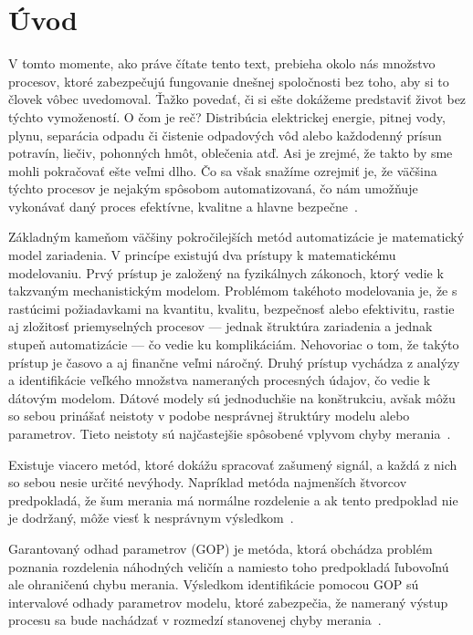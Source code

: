 \chapter*{Úvod}
V tomto momente, ako práve čítate tento text, prebieha okolo nás množstvo procesov, ktoré zabezpečujú fungovanie dnešnej spoločnosti bez toho, aby si to človek vôbec uvedomoval. Ťažko povedať, či si ešte dokážeme predstaviť život bez týchto vymožeností. O čom je reč? Distribúcia elektrickej energie, pitnej vody, plynu, separácia 
odpadu či čistenie odpadových vôd alebo každodenný prísun potravín, liečiv, pohonných hmôt, oblečenia atď. Asi je zrejmé, že takto by sme mohli pokračovať ešte veľmi dlho. Čo sa však snažíme ozrejmiť je, že väčšina týchto procesov je nejakým spôsobom automatizovaná, čo nám umožňuje vykonávať daný proces efektívne, kvalitne a hlavne bezpečne~\cite{spautz:automat_pros:1994}. 

Základným kameňom väčšiny pokročilejších metód automatizácie je matematický model zariadenia. V princípe existujú dva prístupy k matematickému modelovaniu. Prvý prístup je založený na fyzikálnych zákonoch, ktorý vedie k takzvaným mechanistickým modelom. Problémom takéhoto modelovania je, že s rastúcimi požiadavkami na kvantitu, kvalitu, bezpečnosť alebo efektivitu, rastie aj zložitosť priemyselných procesov --- jednak štruktúra zariadenia a jednak stupeň automatizácie --- čo vedie ku komplikáciám. Nehovoriac o tom, že takýto prístup je časovo a aj finančne veľmi náročný. Druhý prístup vychádza z analýzy a identifikácie veľkého množstva nameraných procesných údajov, čo vedie k dátovým modelom. Dátové modely sú jednoduchšie na konštrukciu, avšak môžu so sebou prinášať neistoty v podobe nesprávnej štruktúry modelu alebo parametrov. Tieto neistoty sú najčastejšie spôsobené vplyvom chyby merania~\cite{evans:data_modelling:1992}.

Existuje viacero metód, ktoré dokážu spracovať zašumený signál, a každá z nich so sebou nesie určité nevýhody. Napríklad metóda najmenších štvorcov predpokladá, že šum merania má normálne rozdelenie a ak tento predpoklad nie je dodržaný, môže viesť k nesprávnym výsledkom~\cite{martin:lsq_method:2012}.

Garantovaný odhad parametrov (GOP) je metóda, ktorá obchádza problém poznania rozdelenia náhodných veličín a namiesto toho predpokladá ľubovoľnú ale ohraničenú chybu merania. Výsledkom identifikácie pomocou GOP sú intervalové odhady parametrov modelu, ktoré zabezpečia, že nameraný výstup procesu sa bude nachádzať v rozmedzí stanovenej chyby merania~\cite{paulen:gpe:2017}.  

